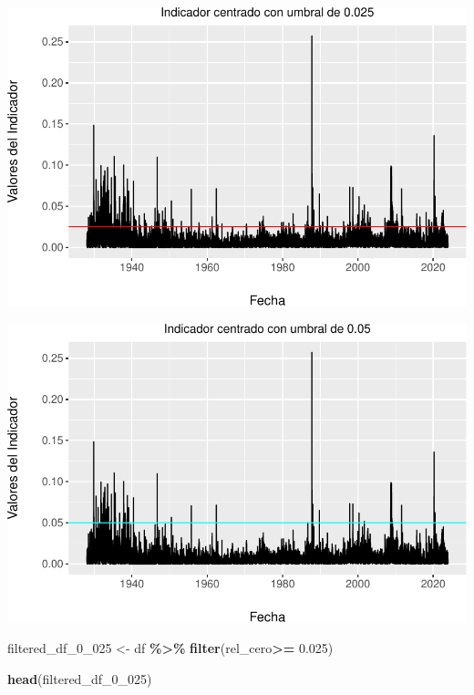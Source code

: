 \documentclass[
  oneside]{article}
\newenvironment{Shaded}{\begin{snugshade}}{\end{snugshade}}
\newcommand{\FloatTok}[1]{\textcolor[rgb]{0.00,0.00,0.81}{#1}}
\newcommand{\FunctionTok}[1]{\textcolor[rgb]{0.13,0.29,0.53}{\textbf{#1}}}
\newcommand{\NormalTok}[1]{#1}
\newcommand{\OtherTok}[1]{\textcolor[rgb]{0.56,0.35,0.01}{#1}}
\newcommand{\SpecialCharTok}[1]{\textcolor[rgb]{0.81,0.36,0.00}{\textbf{#1}}}
\begin{document}
\includegraphics{main_files/figure-latex/unnamed-chunk-23-1.pdf}

\includegraphics{main_files/figure-latex/unnamed-chunk-24-1.pdf}

\begin{Shaded}
\begin{Highlighting}[]
\NormalTok{filtered\_df\_0\_025 }\OtherTok{\textless{}{-}}\NormalTok{ df }\SpecialCharTok{\%\textgreater{}\%}
  \FunctionTok{filter}\NormalTok{(rel\_cero}\SpecialCharTok{\textgreater{}=} \FloatTok{0.025}\NormalTok{)}
\end{Highlighting}
\end{Shaded}

\begin{Shaded}
\begin{Highlighting}[]
\FunctionTok{head}\NormalTok{(filtered\_df\_0\_025)}
\end{Highlighting}
\end{Shaded}
\end{document}
